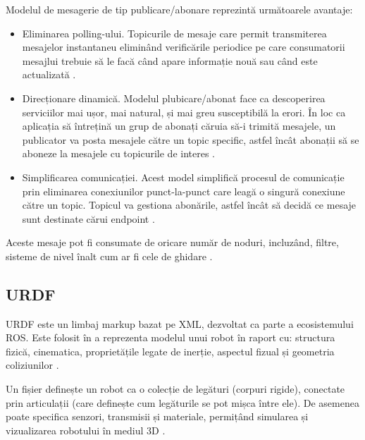 Modelul de mesagerie de tip publicare/abonare reprezintă următoarele avantaje:
\begin{itemize}
	\item Eliminarea polling-ului. Topicurile de mesaje care permit transmiterea mesajelor instantaneu eliminând verificările periodice pe care consumatorii mesajlui trebuie să le facă când apare informație nouă sau când este actualizată \cite{ps}.
	\item Direcționare dinamică. Modelul plubicare/abonat face ca descoperirea serviciilor mai ușor, mai natural, și mai greu susceptibilă la erori. În loc ca aplicația să întrețină un grup de abonați căruia să-i trimită mesajele, un publicator va posta mesajele către un topic specific, astfel încât abonații să se aboneze la mesajele cu topicurile de interes \cite{ps}.
	\item Simplificarea comunicației. Acest model simplifică procesul de comunicație prin eliminarea conexiunilor punct-la-punct care leagă o singură conexiune către un topic. Topicul va gestiona abonările, astfel încât să decidă ce mesaje sunt destinate cărui endpoint \cite{ps}.
\end{itemize}

Aceste mesaje pot fi consumate de oricare număr de noduri, incluzând, filtre, sisteme de nivel înalt cum ar fi cele de ghidare \cite{ros}. 


\subsection{URDF}
URDF este un limbaj markup bazat pe XML, dezvoltat ca parte a ecosistemului ROS. Este folosit în a reprezenta modelul unui robot în raport cu: structura fizică, cinematica, proprietățile legate de inerție, aspectul fizual și geometria coliziunilor \cite{urdf}.

Un fișier definește un robot ca o colecție de legături (corpuri rigide), conectate prin articulații (care definește cum legăturile se pot mișca între ele). De asemenea poate specifica senzori, transmisii și materiale, permițând simularea și vizualizarea robotului în mediul 3D \cite{urdf}.

